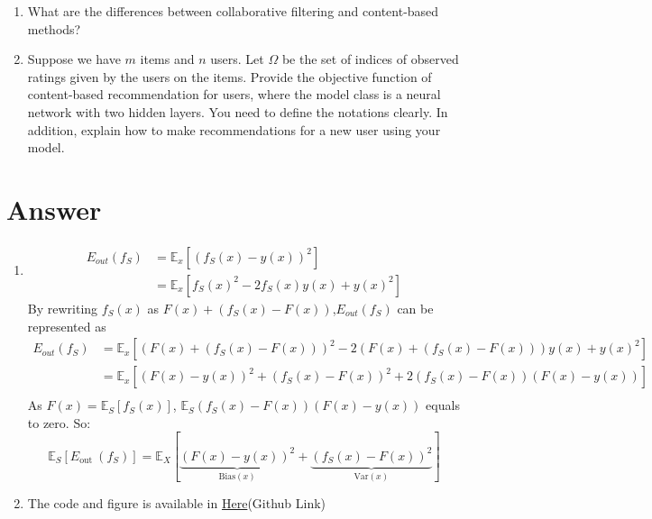 \documentclass[
	12pt, %
]{fphw}
\begin{document}
\begin{problem}
	\begin{enumerate}
	\itemsep0.3em
	\parskip0.3em
	\item What are the differences between collaborative filtering and content-based methods? 
    


    \item Suppose we have $m$ items and $n$ users. Let $\Omega$ be the set of indices of observed ratings given by the users on the items. Provide the objective function of content-based recommendation for users, where the model class is a neural network with two hidden layers. You need to define the notations clearly. In addition, explain how to make recommendations for a new user using your model. 
\end{enumerate}
  
	


\end{problem}

\section*{Answer}
\begin{enumerate}
\item 
\begin{equation*}
	\begin{aligned}
		E_{out}(f_S) &= \mathbb{E}_x[(f_S(x)-y(x))^2] \\
		 &= \mathbb{E}_x[f_S(x)^2-2f_S(x)y(x)+y(x)^2]
	\end{aligned}
\end{equation*}
By rewriting $f_S(x)$ as $F(x)+(f_S(x)-F(x))$,$E_{out}(f_S)$ can be represented as 
\begin{equation*}
	\begin{aligned}
	E_{out}(f_S)&=\mathbb{E}_x[(F(x)+(f_S(x)-F(x)))^2-2(F(x)+(f_S(x)-F(x)))y(x)+y(x)^2] \\
	            &=\mathbb{E}_x[(F(x)-y(x))^2+(f_S(x)-F(x))^2+2(f_S(x)-F(x))(F(x)-y(x))] \\
	\end{aligned}
\end{equation*}
As $F(x)=\mathbb{E}_{S}\left[f_{S}(x)\right]$, $\mathbb{E}_{S}(f_S(x)-F(x))(F(x)-y(x))$ equals to zero. So:
\begin{equation*}
	\mathbb{E}_{S}\left[E_{\mathrm{out}}\:(f_{S})\right]=\mathbb{E}_{X}[\underbrace{(F(x)-y(x))^{2}}_{\mathrm{Bias}(x)}+\underbrace{(f_{S}(x)-F(x))^2}_{\mathrm{Var}(x)}]
\end{equation*}
\item The code and figure is available in \href{https://github.com/fanyimeng0/AIR6002/blob/main/HW1/Code/notebook_2.ipynb}{Here}(Github Link)

\end{enumerate}
\end{document}

